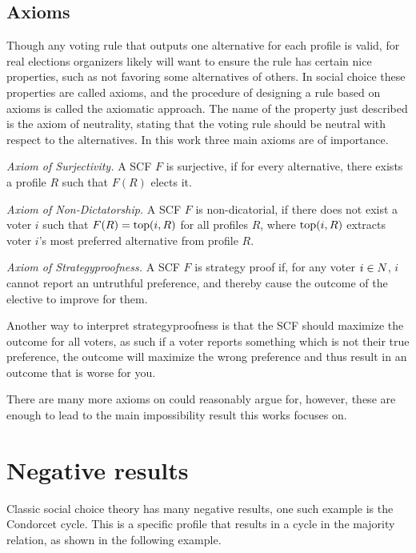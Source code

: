 \subsection{Axioms}
Though any voting rule that outputs one alternative for each profile is valid, for real elections organizers likely will want to ensure the rule has certain nice properties, such as not favoring some alternatives of others. In social choice these properties are called axioms, and the procedure of designing a rule based on axioms is called the axiomatic approach. The name of the property just described is the axiom of neutrality, stating that the voting rule should be neutral with respect to the alternatives. In this work three main axioms are of importance.

\textit{Axiom of Surjectivity.} A SCF $F$ is surjective, if for every alternative, there exists a profile $R$ such that $F(R)$ elects it.

\textit{Axiom of Non-Dictatorship.} A SCF $F$ is non-dicatorial, if there does not exist a voter $i$ such that $F(R) = \textnormal{top}(i,R)$ for all profiles $R$, where $\textnormal{top}(i,R)$  extracts voter $i$'s most preferred alternative from profile $R$.

\textit{Axiom of Strategyproofness.} A SCF $F$ is strategy proof if, for any voter $i \in N$, $i$ cannot report an untruthful preference, and thereby cause the outcome of the elective to improve for them. 

Another way to interpret strategyproofness is that the SCF should maximize the outcome for all voters, as such  if a voter reports something which is not their true preference, the outcome will maximize the wrong preference and thus result in an outcome that is worse for you.

There are many more axioms on could reasonably argue for, however, these are enough to lead to the main impossibility result this works focuses on.

\section{Negative results}
Classic social choice theory has many negative results, one such example is the Condorcet cycle. This is a specific profile that results in a cycle in the majority relation, as shown in the following example.

